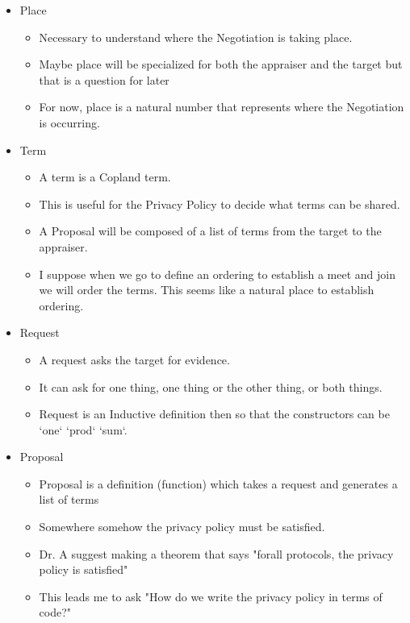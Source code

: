 \documentclass[10pt]{article}
\newcommand{\squash}{\itemsep=0pt\parskip=0pt}
\begin{document}
\begin{itemize}
\item Place
	\begin{itemize}
	\squash
	\item Necessary to understand where the Negotiation is taking place.
	\item Maybe place will be specialized for both the appraiser and the target but that is a question for later
	\item For now, place is a natural number that represents where the Negotiation is occurring.  
	\end{itemize}
\item Term
	\begin{itemize}
	\squash
	\item A term is a Copland term. 
	\item This is useful for the Privacy Policy to decide what terms can be shared. 
	\item A Proposal will be composed of a list of terms from the target to the appraiser.
	\item I suppose when we go to define an ordering to establish a meet and join we will order the terms. This seems like a natural place to establish ordering. 
	\end{itemize}
\item Request
	\begin{itemize}
	\item A request asks the target for evidence. 
	\item It can ask for one thing, one thing or the other thing, or both things. 
	\item Request is an Inductive definition then so that the constructors can be `one` `prod` `sum`.
	\end{itemize}
\item Proposal
	\begin{itemize}
	\item Proposal is a definition (function) which takes a request and generates a list of terms
	\item Somewhere somehow the privacy policy must be satisfied. 
	\item Dr. A suggest making a theorem that says "forall protocols, the privacy policy is satisfied"
	\item This leads me to ask "How do we write the privacy policy in terms of code?"
	\end{itemize}

\end{itemize}
\end{document}
